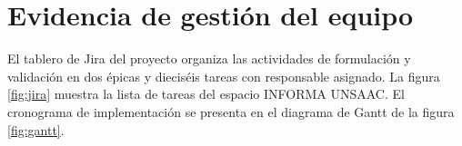\section{Evidencia de gestión del equipo}\label{sec:evidencia_gestion}
El tablero de Jira del proyecto organiza las actividades de formulación y validación en dos épicas y dieciséis tareas con responsable asignado. La figura \ref{fig:jira} muestra la lista de tareas del espacio INFORMA UNSAAC. El cronograma de implementación se presenta en el diagrama de Gantt de la figura \ref{fig:gantt}.
